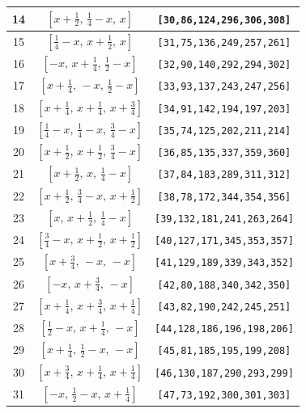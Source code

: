 \documentclass[fleqn,8pt]{jsarticle}
\begin{document}
\begin{longtable}{ccc}
14 & $\left[ x + \frac{1}{2},\, \frac{1}{4} - x,\, x \right]$ & {\tt [30,86,124,296,306,308]} \\ \hline
15 & $\left[ \frac{1}{4} - x,\, x + \frac{1}{2},\, x \right]$ & {\tt [31,75,136,249,257,261]} \\ \hline
16 & $\left[ - x,\, x + \frac{1}{4},\, \frac{1}{2} - x \right]$ & {\tt [32,90,140,292,294,302]} \\ \hline
17 & $\left[ x + \frac{1}{4},\, - x,\, \frac{1}{2} - x \right]$ & {\tt [33,93,137,243,247,256]} \\ \hline
18 & $\left[ x + \frac{1}{4},\, x + \frac{1}{4},\, x + \frac{3}{4} \right]$ & {\tt [34,91,142,194,197,203]} \\ \hline
19 & $\left[ \frac{1}{4} - x,\, \frac{1}{4} - x,\, \frac{3}{4} - x \right]$ & {\tt [35,74,125,202,211,214]} \\ \hline
20 & $\left[ x + \frac{1}{2},\, x + \frac{1}{2},\, \frac{3}{4} - x \right]$ & {\tt [36,85,135,337,359,360]} \\ \hline
21 & $\left[ x + \frac{1}{2},\, x,\, \frac{1}{4} - x \right]$ & {\tt [37,84,183,289,311,312]} \\ \hline
22 & $\left[ x + \frac{1}{2},\, \frac{3}{4} - x,\, x + \frac{1}{2} \right]$ & {\tt [38,78,172,344,354,356]} \\ \hline
23 & $\left[ x,\, x + \frac{1}{2},\, \frac{1}{4} - x \right]$ & {\tt [39,132,181,241,263,264]} \\ \hline
24 & $\left[ \frac{3}{4} - x,\, x + \frac{1}{2},\, x + \frac{1}{2} \right]$ & {\tt [40,127,171,345,353,357]} \\ \hline
25 & $\left[ x + \frac{3}{4},\, - x,\, - x \right]$ & {\tt [41,129,189,339,343,352]} \\ \hline
26 & $\left[ - x,\, x + \frac{3}{4},\, - x \right]$ & {\tt [42,80,188,340,342,350]} \\ \hline
27 & $\left[ x + \frac{1}{4},\, x + \frac{3}{4},\, x + \frac{1}{4} \right]$ & {\tt [43,82,190,242,245,251]} \\ \hline
28 & $\left[ \frac{1}{2} - x,\, x + \frac{1}{4},\, - x \right]$ & {\tt [44,128,186,196,198,206]} \\ \hline
29 & $\left[ x + \frac{1}{4},\, \frac{1}{2} - x,\, - x \right]$ & {\tt [45,81,185,195,199,208]} \\ \hline
30 & $\left[ x + \frac{3}{4},\, x + \frac{1}{4},\, x + \frac{1}{4} \right]$ & {\tt [46,130,187,290,293,299]} \\ \hline
31 & $\left[ - x,\, \frac{1}{2} - x,\, x + \frac{1}{4} \right]$ & {\tt [47,73,192,300,301,303]} \\ \hline

\end{longtable}
\end{document}

